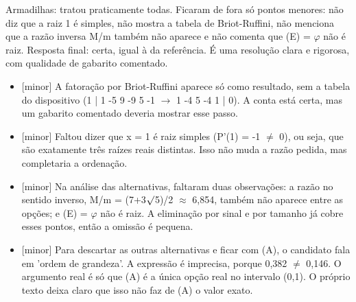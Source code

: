 \documentclass{article}%
\begin{document}
Armadilhas: tratou praticamente todas. Ficaram de fora só pontos menores: não diz que a raiz 1 é simples, não mostra a tabela de Briot{-}Ruffini, não menciona que a razão inversa M/m também não aparece e não comenta que (E) = $\varphi$ não é raiz.\newline%
\newline%
Resposta final: certa, igual à da referência. É uma resolução clara e rigorosa, com qualidade de gabarito comentado.%
\begin{itemize}%
\item%
{[}minor{]} A fatoração por Briot{-}Ruffini aparece só como resultado, sem a tabela do dispositivo (1 | 1 -5 9 -9 5 -1 $\to$ 1 -4 5 -4 1 | 0). A conta está certa, mas um gabarito comentado deveria mostrar esse passo.%
\item%
{[}minor{]} Faltou dizer que x = 1 é raiz simples (P'(1) = -1 $\neq$ 0), ou seja, que são exatamente três raízes reais distintas. Isso não muda a razão pedida, mas completaria a ordenação.%
\item%
{[}minor{]} Na análise das alternativas, faltaram duas observações: a razão no sentido inverso, M/m = (7+3$\surd$5)/2 $\approx$ 6,854, também não aparece entre as opções; e (E) = $\varphi$ não é raiz. A eliminação por sinal e por tamanho já cobre esses pontos, então a omissão é pequena.%
\item%
{[}minor{]} Para descartar as outras alternativas e ficar com (A), o candidato fala em 'ordem de grandeza'. A expressão é imprecisa, porque 0,382 $\neq$ 0,146. O argumento real é só que (A) é a única opção real no intervalo (0,1). O próprio texto deixa claro que isso não faz de (A) o valor exato.%
\end{itemize}%
\end{document}
